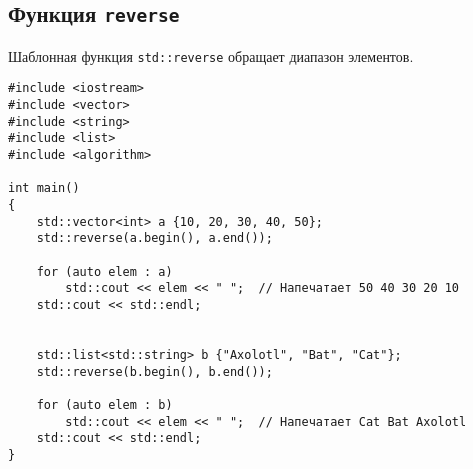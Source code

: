 \documentclass{article}
\begin{document}
\subsection*{Функция \texttt{reverse}}
Шаблонная функция \texttt{std::reverse} обращает диапазон элементов.
\begin{lstlisting}
#include <iostream>
#include <vector>
#include <string>
#include <list>
#include <algorithm>

int main()
{
	std::vector<int> a {10, 20, 30, 40, 50};
	std::reverse(a.begin(), a.end());
	
	for (auto elem : a)
		std::cout << elem << " ";  // Напечатает 50 40 30 20 10
	std::cout << std::endl;
	
	
	std::list<std::string> b {"Axolotl", "Bat", "Cat"};
	std::reverse(b.begin(), b.end());
	
	for (auto elem : b)
		std::cout << elem << " ";  // Напечатает Cat Bat Axolotl
	std::cout << std::endl;
}
\end{lstlisting}
\end{document}
